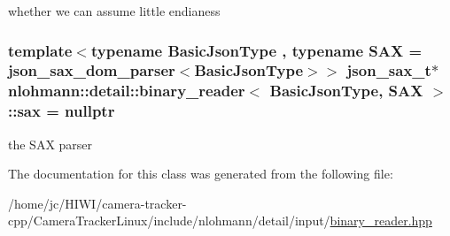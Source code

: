 whether we can assume little endianess 

\subsubsection[{\texorpdfstring{sax}{sax}}]{\setlength{\rightskip}{0pt plus 5cm}template$<$typename Basic\+Json\+Type , typename S\+AX  = json\+\_\+sax\+\_\+dom\+\_\+parser$<$\+Basic\+Json\+Type$>$$>$ {\bf json\+\_\+sax\+\_\+t}$\ast$ {\bf nlohmann\+::detail\+::binary\+\_\+reader}$<$ Basic\+Json\+Type, S\+AX $>$\+::sax = nullptr\hspace{0.3cm}{\ttfamily [private]}}\hypertarget{classnlohmann_1_1detail_1_1binary__reader_ac9313177e414403e3e5784340d838b3f}{}\label{classnlohmann_1_1detail_1_1binary__reader_ac9313177e414403e3e5784340d838b3f}


the S\+AX parser 



The documentation for this class was generated from the following file\+:\begin{DoxyCompactItemize}
\item 
/home/jc/\+H\+I\+W\+I/camera-\/tracker-\/cpp/\+Camera\+Tracker\+Linux/include/nlohmann/detail/input/\hyperlink{binary__reader_8hpp}{binary\+\_\+reader.\+hpp}\end{DoxyCompactItemize}

